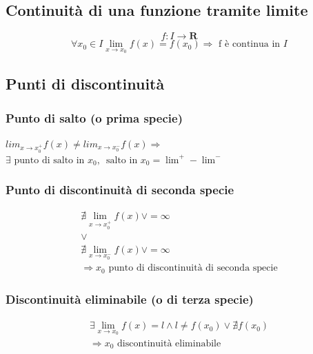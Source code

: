 \documentclass{report}
\begin{document}
    \subsection{Continuità di una funzione tramite limite}
        $$f: I \longrightarrow \mathbf{R}$$
        $$\forall x_0 \in I \lim_{x \to x_0} f\left(x\right) = f\left(x_0\right) \Longrightarrow \textrm{ f è continua in }I$$
    \subsection{Punti di discontinuità}
        \subsubsection{Punto di salto (o prima specie)}
            $lim_{x \to x_0^+} f\left(x\right) \neq lim_{x \to x_0^-} f\left(x\right) \Longrightarrow$ \\
            $\exists \textrm{ punto di salto in } x_0, \, \textrm{ salto in }x_0 = \lim^+ - \lim^-$
        \subsubsection{Punto di discontinuità di seconda specie}
            $$\begin{array}{c}
                \nexists \lim_{x \to x_0^+} f\left(x\right) \vee = \infty \\
                \vee \\
                \nexists \lim_{x \to x_0^-} f\left(x\right) \vee = \infty \\ 
                \Longrightarrow x_0 \textrm{ punto di discontinuità di seconda specie}
            \end{array}$$
        \subsubsection{Discontinuità eliminabile (o di terza specie)}
            $$\begin{array}{c}
                \exists \lim_{x \to x_0} f\left(x\right) = l \wedge l \neq f\left(x_0\right) \vee \nexists f\left(x_0\right) \\
                \Longrightarrow x_0 \textrm{ discontinuità eliminabile }
            \end{array}$$

\newpage
\end{document}
